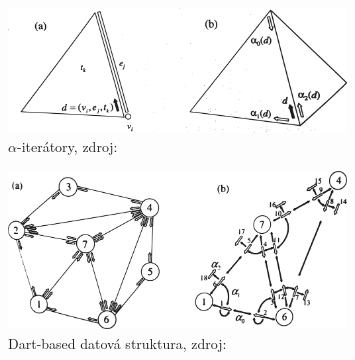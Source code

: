 \documentclass[12pt,a4paper]{article}
\begin{document}
\begin{figure}[h!]
\centering
\includegraphics[width=0.8\textwidth]{img/iterators.png}
\caption{$\alpha$-iterátory, zdroj: \cite{triangulation}}
\label{fig:iterators}
\end{figure}

\newpage
\begin{figure}[h!]
\centering
\includegraphics[width=0.8\textwidth]{img/dart_struct.png}
\caption{Dart-based datová struktura, zdroj: \cite{triangulation}}
\label{fig:dart_struct}
\end{figure}
\end{document}
